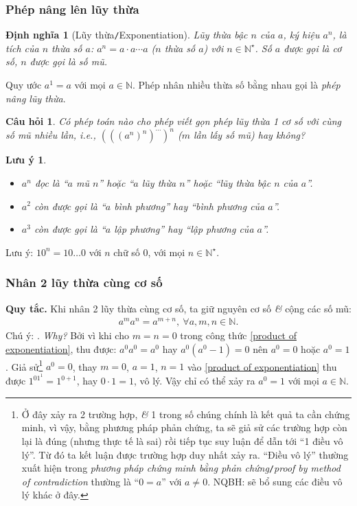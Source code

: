 \documentclass{article}
\numberwithin{equation}{section}
\newtheorem{dinhnghia}{Định nghĩa}[section]
\newtheorem{cauhoi}{Câu hỏi}[section]
\newtheorem{luuy}{Lưu ý}[section]
\begin{document}
\subsubsection{Phép nâng lên lũy thừa}

\begin{dinhnghia}[Lũy thừa\texttt{/}Exponentiation]
	\emph{Lũy thừa bậc $n$} của $a$, ký hiệu $a^n$, là tích của $n$ thừa số $a$: $a^n = a\cdot a\cdots a$ ($n$ thừa số $a$) với $n\in\mathbb{N}^\star$. Số $a$ được gọi là \emph{cơ số}, $n$ được gọi là \emph{số mũ}.
\end{dinhnghia}
Quy ước $a^1 = a$ với mọi $a\in\mathbb{N}$. Phép nhân nhiều thừa số bằng nhau gọi là \textit{phép nâng lũy thừa}.

\begin{cauhoi}
	Có phép toán nào cho phép viết gọn phép lũy thừa 1 cơ số với cùng số mũ nhiều lần, i.e., $(((a^n)^n)^{\cdots})^n$ ($m$ lần lấy số mũ) hay không?
\end{cauhoi}

\begin{luuy}
	\begin{itemize}
		\item $a^n$ đọc là ``$a$ mũ $n$'' hoặc ``$a$ lũy thừa $n$'' hoặc ``lũy thừa bậc $n$ của $a$''.
		\item $a^2$ còn được gọi là ``$a$ bình phương'' hay ``bình phương của $a$''.
		\item $a^3$ còn được gọi là ``$a$ lập phương'' hay ``lập phương của $a$''.
	\end{itemize}
\end{luuy}
Lưu ý: $10^n = 10\ldots 0$ với $n$ chữ số 0, với mọi $n\in\mathbb{N}^\star$.

\subsubsection{Nhân 2 lũy thừa cùng cơ số}
\textbf{Quy tắc.} Khi nhân 2 lũy thừa cùng cơ số, ta giữ nguyên cơ số \textit{\&} cộng các số mũ:
\begin{align}
	\label{product of exponentiation}
	\boxed{a^ma^n = a^{m+n},\ \forall a,m,n\in\mathbb{N}.}
\end{align}
Chú ý: . \textit{Why?} Bởi vì khi cho $m = n = 0$ trong công thức \eqref{product of exponentiation}, thu được: $a^0a^0 = a^0$ hay $a^0(a^0 - 1) = 0$ nên $a^0 = 0$ hoặc $a^0 = 1$. Giả sử\footnote{Ở đây xảy ra 2 trường hợp, \textit{\&} 1 trong số chúng chính là kết quả ta cần chứng minh, vì vậy, bằng phương pháp phản chứng, ta sẽ giả sử các trường hợp còn lại là đúng (nhưng thực tế là sai) rồi tiếp tục suy luận để dẫn tới ``1 điều vô lý''. Từ đó ta kết luận được trường hợp duy nhất xảy ra. ``Điều vô lý'' thường xuất hiện trong \textit{phương pháp chứng minh bằng phản chứng}\texttt{/}\textit{proof by method of contradiction} thường là ``$0 = a$'' với $a\ne 0$. NQBH: sẽ bổ sung các điều vô lý khác ở đây.} $a^0 = 0$, thay $m = 0$, $a = 1$, $n = 1$ vào \eqref{product of exponentiation} thu được $1^01^1 = 1^{0+1}$, hay $0\cdot 1 = 1$, vô lý. Vậy chỉ có thể xảy ra $a^0 = 1$ với mọi $a\in\mathbb{N}$.
\end{document}
